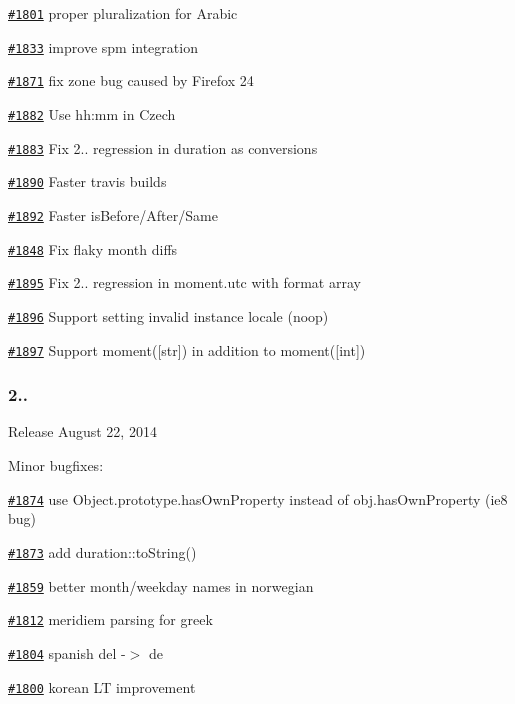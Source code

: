 \begin{DoxyItemize}
\item \href{https://github.com/moment/moment/issues/1801}{\tt \#1801} proper pluralization for Arabic
\item \href{https://github.com/moment/moment/issues/1833}{\tt \#1833} improve spm integration
\item \href{https://github.com/moment/moment/issues/1871}{\tt \#1871} fix zone bug caused by Firefox 24
\item \href{https://github.com/moment/moment/issues/1882}{\tt \#1882} Use hh\+:mm in Czech
\item \href{https://github.com/moment/moment/issues/1883}{\tt \#1883} Fix 2.. regression in duration as conversions
\item \href{https://github.com/moment/moment/issues/1890}{\tt \#1890} Faster travis builds
\item \href{https://github.com/moment/moment/issues/1892}{\tt \#1892} Faster is\+Before/\+After/\+Same
\item \href{https://github.com/moment/moment/issues/1848}{\tt \#1848} Fix flaky month diffs
\item \href{https://github.com/moment/moment/issues/1895}{\tt \#1895} Fix 2.. regression in moment.\+utc with format array
\item \href{https://github.com/moment/moment/issues/1896}{\tt \#1896} Support setting invalid instance locale (noop)
\item \href{https://github.com/moment/moment/issues/1897}{\tt \#1897} Support moment(\mbox{[}str\mbox{]}) in addition to moment(\mbox{[}int\mbox{]})
\end{DoxyItemize}

\subsubsection*{2..}


\begin{DoxyItemize}
\item Release August 22, 2014
\end{DoxyItemize}

Minor bugfixes\+:


\begin{DoxyItemize}
\item \href{https://github.com/moment/moment/issues/1874}{\tt \#1874} use {\ttfamily Object.\+prototype.\+has\+Own\+Property} instead of {\ttfamily obj.\+has\+Own\+Property} (ie8 bug)
\item \href{https://github.com/moment/moment/issues/1873}{\tt \#1873} add {\ttfamily duration\+::to\+String()}
\item \href{https://github.com/moment/moment/issues/1859}{\tt \#1859} better month/weekday names in norwegian
\item \href{https://github.com/moment/moment/issues/1812}{\tt \#1812} meridiem parsing for greek
\item \href{https://github.com/moment/moment/issues/1804}{\tt \#1804} spanish del -\/$>$ de
\item \href{https://github.com/moment/moment/issues/1800}{\tt \#1800} korean LT improvement
\end{DoxyItemize}

